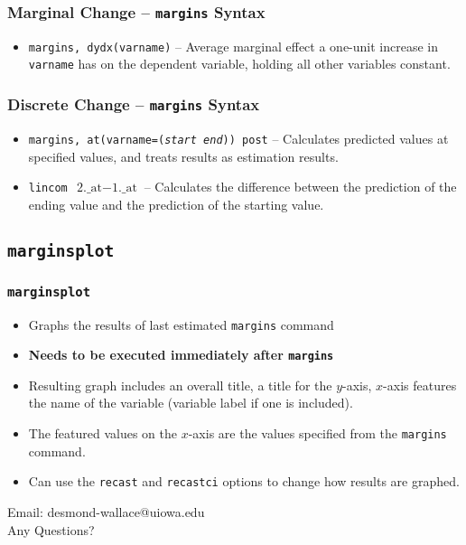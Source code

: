 \documentclass{beamer}
\begin{document}
\begin{frame}
	\frametitle{Marginal Change -- \texttt{margins} Syntax}
		\begin{itemize}
			\item \texttt{margins, dydx(varname)} -- Average marginal effect a one-unit increase in \texttt{varname} has on the dependent variable, holding all other variables constant.
		\end{itemize}
\end{frame}

\begin{frame}
	\frametitle{Discrete Change -- \texttt{margins} Syntax}
		\begin{itemize}
			\item \texttt{margins, at(varname=(\textit{start} \textit{end})) post} -- Calculates predicted values at specified values, and treats results as estimation results.
			\item \texttt{lincom $\mbox{2.\_at}-\mbox{1.\_at}$} -- Calculates the difference between the prediction of the ending value and the prediction of the starting value.
		\end{itemize}
\end{frame}

\subsection{\texttt{marginsplot}}

\begin{frame}
	\frametitle{\texttt{marginsplot}}
	\begin{itemize}
		\item Graphs the results of last estimated \texttt{margins} command
		\item \textbf{Needs to be executed immediately after \texttt{margins}}
		\item Resulting graph includes an overall title, a title for the $y$-axis, $x$-axis features the name of the variable (variable label if one is included).
		\item The featured values on the $x$-axis are the values specified from the \texttt{margins} command.
		\item Can use the \texttt{recast} and \texttt{recastci} options to change how results are graphed.
	\end{itemize} 
\end{frame}

\begin{frame}
	\begin{center}
		\begin{LARGE}
			Email: desmond-wallace@uiowa.edu\\
			Any Questions?
		\end{LARGE}
	\end{center}
\end{frame}
\end{document}
